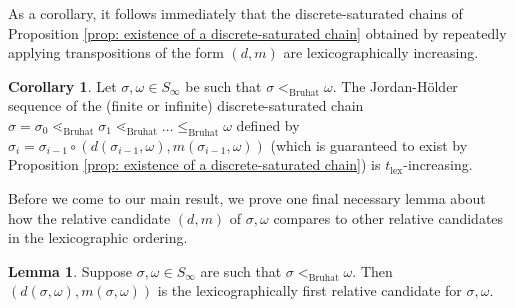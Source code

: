 \documentclass[oneside,11pt,reqno]{amsart}
\theoremstyle{definition}
\newtheorem{proof techniques}{Proof Techniques}
\newtheorem{lemma}{Lemma}
\newtheorem{corollary}{Corollary}
\begin{document}
As a corollary, it follows immediately that the discrete-saturated chains of Proposition \ref{prop: existence of a discrete-saturated chain} obtained by repeatedly applying transpositions of the form $(d , m)$ are lexicographically increasing. 

\begin{corollary}\label{cor: existence of an increasing discrete-saturated chain}
    Let $\sigma , \omega \in S_\infty$ be such that $\sigma <_\text{Bruhat} \omega$. The Jordan-H\"{o}lder sequence of the (finite or infinite) discrete-saturated chain $\sigma  = \sigma_0 \lessdot_\text{Bruhat} \sigma_1 \lessdot_\text{Bruhat} \ldots \leq_{\text{Bruhat}} \omega$ defined by $\sigma_i = \sigma_{i - 1} \circ (d(\sigma_{i - 1} , \omega) , m(\sigma_{i - 1} , \omega) )$ (which is guaranteed to exist by Proposition \ref{prop: existence of a discrete-saturated chain}) is $t_\text{lex}$-increasing. 
\end{corollary}

Before we come to our main result, we prove one final necessary lemma about how the relative candidate $(d, m)$ of $\sigma , \omega$ compares to other relative candidates in the lexicographic ordering. 

\begin{lemma}\label{lem: d , m is lex first relative candidate}
    Suppose $\sigma, \omega \in S_\infty$ are such that $\sigma <_\text{Bruhat} \omega$. Then $(d(\sigma , \omega) , m(\sigma , \omega))$ is the lexicographically first relative candidate for $\sigma , \omega$. 
\end{lemma}
\end{document}

